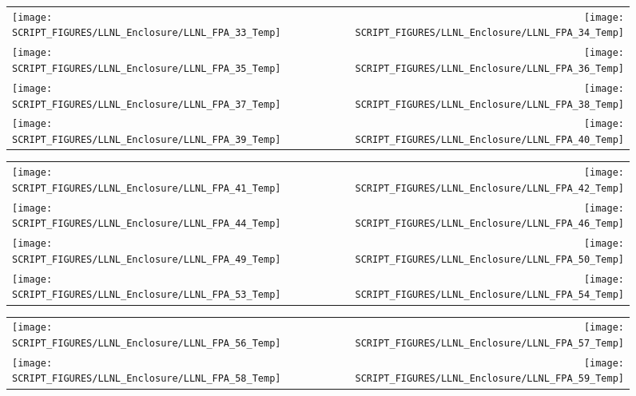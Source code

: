 \begin{figure}[p]
\begin{tabular*}{\textwidth}{l@{\extracolsep{\fill}}r}
\texttt{[image: SCRIPT\_FIGURES/LLNL\_Enclosure/LLNL\_FPA\_33\_Temp]} &
\texttt{[image: SCRIPT\_FIGURES/LLNL\_Enclosure/LLNL\_FPA\_34\_Temp]} \\
\texttt{[image: SCRIPT\_FIGURES/LLNL\_Enclosure/LLNL\_FPA\_35\_Temp]} &
\texttt{[image: SCRIPT\_FIGURES/LLNL\_Enclosure/LLNL\_FPA\_36\_Temp]} \\
\texttt{[image: SCRIPT\_FIGURES/LLNL\_Enclosure/LLNL\_FPA\_37\_Temp]} &
\texttt{[image: SCRIPT\_FIGURES/LLNL\_Enclosure/LLNL\_FPA\_38\_Temp]} \\
\texttt{[image: SCRIPT\_FIGURES/LLNL\_Enclosure/LLNL\_FPA\_39\_Temp]} &
\texttt{[image: SCRIPT\_FIGURES/LLNL\_Enclosure/LLNL\_FPA\_40\_Temp]}
\end{tabular*}
\end{figure}

\begin{figure}[p]
\begin{tabular*}{\textwidth}{l@{\extracolsep{\fill}}r}
\texttt{[image: SCRIPT\_FIGURES/LLNL\_Enclosure/LLNL\_FPA\_41\_Temp]} &
\texttt{[image: SCRIPT\_FIGURES/LLNL\_Enclosure/LLNL\_FPA\_42\_Temp]} \\
\texttt{[image: SCRIPT\_FIGURES/LLNL\_Enclosure/LLNL\_FPA\_44\_Temp]} &
\texttt{[image: SCRIPT\_FIGURES/LLNL\_Enclosure/LLNL\_FPA\_46\_Temp]} \\
\texttt{[image: SCRIPT\_FIGURES/LLNL\_Enclosure/LLNL\_FPA\_49\_Temp]} &
\texttt{[image: SCRIPT\_FIGURES/LLNL\_Enclosure/LLNL\_FPA\_50\_Temp]} \\
\texttt{[image: SCRIPT\_FIGURES/LLNL\_Enclosure/LLNL\_FPA\_53\_Temp]} &
\texttt{[image: SCRIPT\_FIGURES/LLNL\_Enclosure/LLNL\_FPA\_54\_Temp]}
\end{tabular*}
\end{figure}

\begin{figure}[p]
\begin{tabular*}{\textwidth}{l@{\extracolsep{\fill}}r}
\texttt{[image: SCRIPT\_FIGURES/LLNL\_Enclosure/LLNL\_FPA\_56\_Temp]} &
\texttt{[image: SCRIPT\_FIGURES/LLNL\_Enclosure/LLNL\_FPA\_57\_Temp]} \\
\texttt{[image: SCRIPT\_FIGURES/LLNL\_Enclosure/LLNL\_FPA\_58\_Temp]} &
\texttt{[image: SCRIPT\_FIGURES/LLNL\_Enclosure/LLNL\_FPA\_59\_Temp]}
\end{tabular*}
\end{figure}

